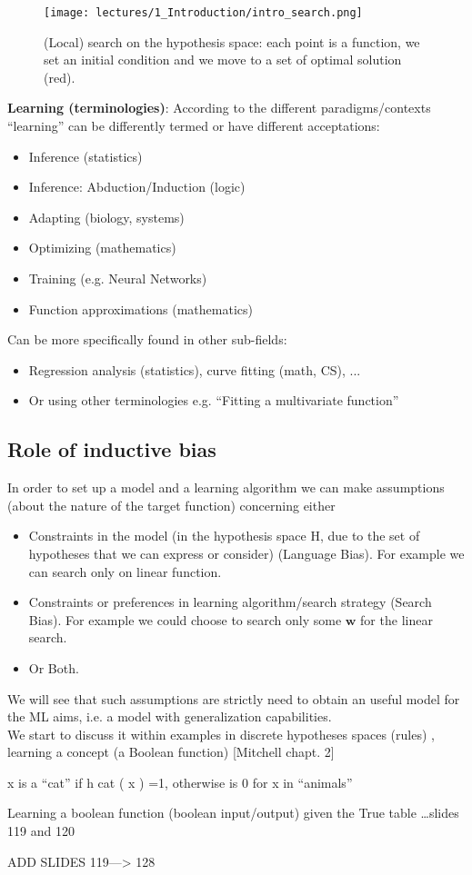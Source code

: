 \documentclass[../main.tex]{subfiles}
\begin{document}
\begin{figure}[ht]
    \centering
    \texttt{[image: lectures/1\_Introduction/intro\_search.png]}
    \caption{(Local) search on the hypothesis space: each point is a function, we set an initial condition and we move to a set of optimal solution (red).}
    \label{fig:lern_search}
\end{figure}

\noindent \textbf{Learning (terminologies)}:
According to the different paradigms/contexts “learning” can be differently termed or have different acceptations:
\begin{itemize}
    \item Inference (statistics)
    \item Inference: Abduction/Induction (logic)
    \item Adapting (biology, systems)
    \item Optimizing (mathematics)
    \item Training (e.g. Neural Networks)
    \item Function approximations (mathematics)
\end{itemize}

\noindent Can be more specifically found in other sub-fields:
\begin{itemize}
    \item Regression analysis (statistics), curve fitting (math, CS), ...
    \item Or using other terminologies e.g. “Fitting a multivariate function”
\end{itemize}

\subsection{Role of inductive bias}%
In order to set up a model and a learning algorithm we can make
assumptions (about the nature of the target function) concerning either
\begin{itemize}
    \item Constraints in the model (in the hypothesis space H, due to the set of
	hypotheses that we can express or consider) (Language Bias). For example we can search only on linear function.
    \item Constraints or preferences in learning algorithm/search strategy (Search Bias). For example we could choose to search only some $\boldsymbol{w}$ for the linear search.
    \item Or Both.
\end{itemize}
We will see that such assumptions are strictly need to obtain an useful model for the ML aims, i.e. a model with generalization capabilities.\\
We start to discuss it within examples in discrete hypotheses spaces (rules) , learning a concept (a Boolean function) [Mitchell chapt. 2]
\begin{example}
x is a “cat” if h cat ( x ) =1, otherwise is 0 for x in “animals”
\end{example}
\begin{example}
    Learning a boolean function (boolean input/output) given the True table \ldots slides 119 and 120
\end{example}
ADD SLIDES 119---> 128
\end{document}
